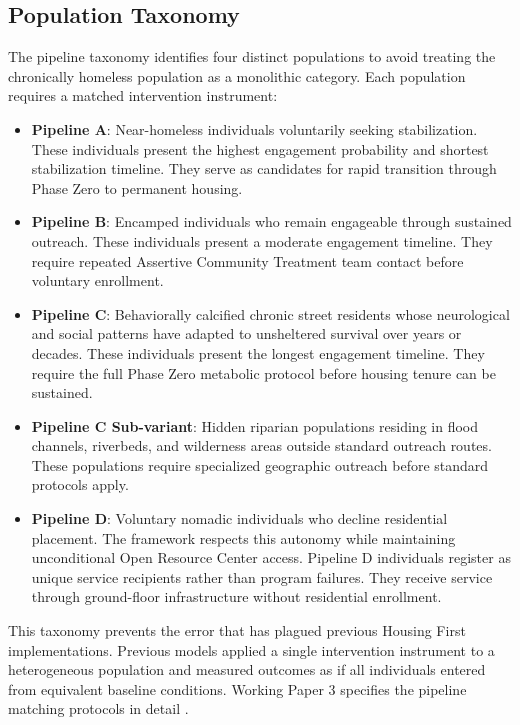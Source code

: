 \documentclass[12pt, letterpaper]{article}
\begin{document}
\subsection{Population Taxonomy}

The pipeline taxonomy identifies four distinct populations to avoid treating the chronically homeless population as a monolithic category. Each population requires a matched intervention instrument:

\begin{itemize}
    \item \textbf{Pipeline A}: Near-homeless individuals voluntarily seeking stabilization. These individuals present the highest engagement probability and shortest stabilization timeline. They serve as candidates for rapid transition through Phase Zero to permanent housing.
    \item \textbf{Pipeline B}: Encamped individuals who remain engageable through sustained outreach. These individuals present a moderate engagement timeline. They require repeated Assertive Community Treatment team contact before voluntary enrollment.
    \item \textbf{Pipeline C}: Behaviorally calcified chronic street residents whose neurological and social patterns have adapted to unsheltered survival over years or decades. These individuals present the longest engagement timeline. They require the full Phase Zero metabolic protocol before housing tenure can be sustained.
    \item \textbf{Pipeline C Sub-variant}: Hidden riparian populations residing in flood channels, riverbeds, and wilderness areas outside standard outreach routes. These populations require specialized geographic outreach before standard protocols apply.
    \item \textbf{Pipeline D}: Voluntary nomadic individuals who decline residential placement. The framework respects this autonomy while maintaining unconditional Open Resource Center access. Pipeline D individuals register as unique service recipients rather than program failures. They receive service through ground-floor infrastructure without residential enrollment.
\end{itemize}

This taxonomy prevents the error that has plagued previous Housing First implementations. Previous models applied a single intervention instrument to a heterogeneous population and measured outcomes as if all individuals entered from equivalent baseline conditions. Working Paper 3 specifies the pipeline matching protocols in detail \citep{dibella_2026_wp3}.
\end{document}
